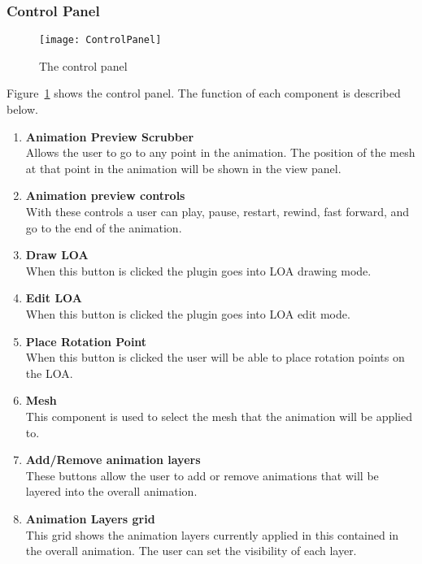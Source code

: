\subsubsection{Control Panel}
\begin{figure}[H]
\centering
\texttt{[image: ControlPanel]}
\caption{The control panel}
\label{fig:controlPanel}
\end{figure}
Figure~\ref{fig:controlPanel} shows the control panel.  The function of each component is described below.
\begin{enumerate}
	\item \textbf{Animation Preview Scrubber} \hfill \\
		Allows the user to go to any point in the animation.  The position of the mesh at that point in the animation will be shown in the view panel.
	\item \textbf{Animation preview controls} \hfill \\
		With these controls a user can play, pause, restart, rewind, fast forward, and go to the end of the animation.
	\item \textbf{Draw LOA} \hfill \\
		When this button is clicked the plugin goes into LOA drawing mode.
	\item \textbf{Edit LOA} \hfill \\
		When this button is clicked the plugin goes into LOA edit mode.
	\item \textbf{Place Rotation Point} \hfill \\
		When this button is clicked the user will be able to place rotation points on the LOA.
	\item \textbf{Mesh} \hfill \\
		This component is used to select the mesh that the animation will be applied to.
	\item \textbf{Add/Remove animation layers} \hfill \\
		These buttons allow the user to add or remove animations that will be layered into the overall animation.
	\item \textbf{Animation Layers grid} \hfill \\
		This grid shows the animation layers currently applied in this contained in the overall animation.  The user can set the visibility of each layer.
\end{enumerate}
